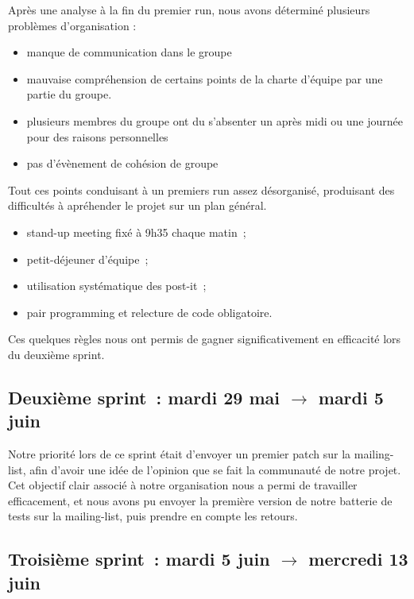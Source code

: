 \documentclass[11pt]{article}
\begin{document}
Après une analyse à la fin du premier run, nous avons déterminé plusieurs problèmes d'organisation : 

\begin{itemize}
\item manque de communication dans le groupe
\item mauvaise compréhension de certains points de la charte d'équipe par une partie du groupe.
\item plusieurs membres du groupe ont du s'absenter un après midi ou une journée pour des raisons personnelles
\item pas d'évènement de cohésion de groupe
\end{itemize}

Tout ces points conduisant à un premiers run assez désorganisé, produisant des difficultés à apréhender le projet sur un plan général.

\begin{itemize}
\item stand-up meeting fixé à 9h35 chaque matin~;
\item petit-déjeuner d'équipe~;
\item utilisation systématique des post-it~;
\item pair programming et relecture de code obligatoire.
\end{itemize}

  Ces quelques règles nous ont permis de gagner significativement en
  efficacité lors du deuxième sprint.

  \subsection{Deuxième sprint~: mardi 29 mai $\rightarrow$ mardi 5 juin}

  Notre priorité lors de ce sprint était d'envoyer un premier patch sur
  la mailing-list, afin d'avoir une idée de l'opinion que se fait la
  communauté de notre projet. Cet objectif clair associé à notre
  organisation nous a permi de travailler efficacement, et nous avons pu
  envoyer la première version de notre batterie de tests sur la
  mailing-list, puis prendre en compte les retours.

  \subsection{Troisième sprint~: mardi 5 juin $\rightarrow$ mercredi 13 juin}
\end{document}
